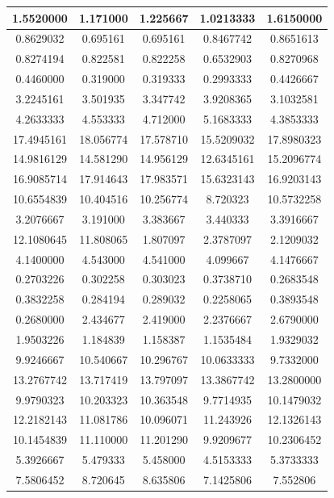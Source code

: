 \begin{longtable}{|c|c|c|c|c|}
    1.5520000 & 1.171000 & 1.225667 & 1.0213333 & 1.6150000 \\ \hline
    0.8629032 & 0.695161 & 0.695161 & 0.8467742 & 0.8651613 \\ \hline
    0.8274194 & 0.822581 & 0.822258 & 0.6532903 & 0.8270968 \\ \hline
    0.4460000 & 0.319000 & 0.319333 & 0.2993333 & 0.4426667 \\ \hline
    3.2245161 & 3.501935 & 3.347742 & 3.9208365 & 3.1032581 \\ \hline
    4.2633333 & 4.553333 & 4.712000 & 5.1683333 & 4.3853333 \\ \hline
    17.4945161 & 18.056774 & 17.578710 & 15.5209032 & 17.8980323 \\ \hline
    14.9816129 & 14.581290 & 14.956129 & 12.6345161 & 15.2096774 \\ \hline
    16.9085714 & 17.914643 & 17.983571 & 15.6323143 & 16.9203143 \\ \hline
    10.6554839 & 10.404516 & 10.256774 & 8.720323 & 10.5732258 \\ \hline
    3.2076667 & 3.191000 & 3.383667 & 3.440333 & 3.3916667 \\ \hline
    12.1080645 & 11.808065 & 1.807097 & 2.3787097 & 2.1209032 \\ \hline
    4.1400000 & 4.543000 & 4.541000 & 4.099667 & 4.1476667 \\ \hline
    0.2703226 & 0.302258 & 0.303023 & 0.3738710 & 0.2683548 \\ \hline
    0.3832258 & 0.284194 & 0.289032 & 0.2258065 & 0.3893548 \\ \hline
    0.2680000 & 2.434677 & 2.419000 & 2.2376667 & 2.6790000 \\ \hline
    1.9503226 & 1.184839 & 1.158387 & 1.1535484 & 1.9329032 \\ \hline
    9.9246667 & 10.540667 & 10.296767 & 10.0633333 & 9.7332000 \\ \hline
    13.2767742 & 13.717419 & 13.797097 & 13.3867742 & 13.2800000 \\ \hline
    9.9790323 & 10.203323 & 10.363548 & 9.7714935 & 10.1479032 \\ \hline
    12.2182143 & 11.081786 & 10.096071 & 11.243926 & 12.1326143 \\ \hline
    10.1454839 & 11.110000 & 11.201290 & 9.9209677 & 10.2306452 \\ \hline
    5.3926667 & 5.479333 & 5.458000 & 4.5153333 & 5.3733333 \\ \hline
    7.5806452 & 8.720645 & 8.635806 & 7.1425806 & 7.552806 \\ \hline

\end{longtable}
